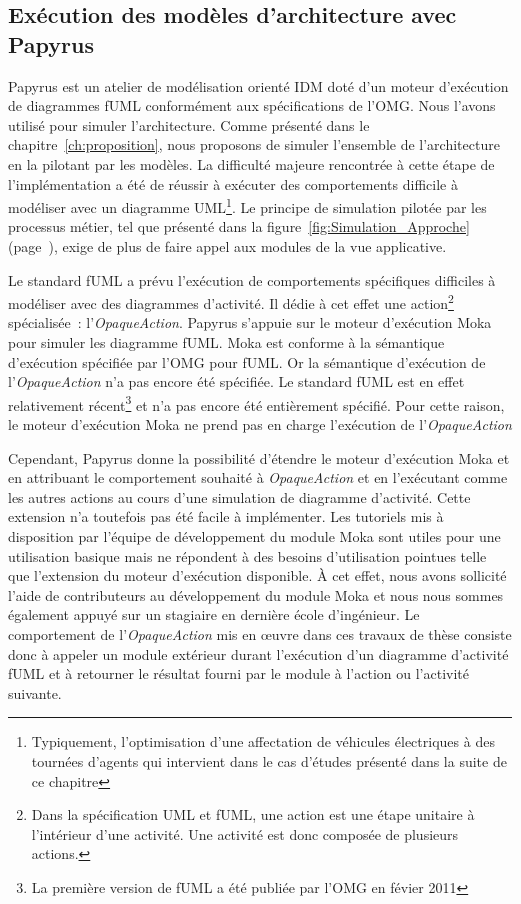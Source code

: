     \subsection{Exécution des modèles d’architecture avec Papyrus}
    \label{sec:opaque_action_papyrus}

    Papyrus est un atelier de modélisation orienté IDM doté d'un moteur
    d'exécution de diagrammes fUML conformément aux spécifications de l'OMG.
    Nous l'avons utilisé pour simuler l'architecture. Comme présenté dans le
    chapitre~\ref{ch:proposition}, nous proposons de simuler l'ensemble de
    l'architecture en la pilotant par les modèles.  La difficulté majeure
    rencontrée à cette étape de l'implémentation a été de réussir à exécuter des
    comportements difficile à modéliser avec un diagramme
    UML\footnote{Typiquement, l'optimisation d'une affectation de véhicules
    électriques à des tournées d'agents qui intervient dans le cas d'études
    présenté dans la suite de ce chapitre}. Le principe de simulation pilotée
    par les processus métier, tel que présenté dans la
    figure~\ref{fig:Simulation_Approche}
    (page~\pageref{fig:Simulation_Approche}), exige de plus de faire appel aux
    modules de la vue applicative.
    
    Le standard fUML a prévu l'exécution de comportements spécifiques difficiles
    à modéliser avec  des diagrammes d'activité. Il dédie à cet effet une
    action\footnote{Dans la spécification UML et fUML, une action est une étape
    unitaire à l'intérieur d'une activité. Une activité est donc composée de
    plusieurs actions.} spécialisée~: l'\emph{OpaqueAction}. Papyrus s'appuie
    sur le moteur d'exécution Moka pour simuler les diagramme fUML. Moka est
    conforme à la sémantique d'exécution spécifiée par l'OMG pour fUML. Or la
    sémantique d'exécution de l'\emph{OpaqueAction} n'a pas encore été
    spécifiée. Le standard fUML est en effet relativement récent\footnote{La
    première version de fUML a été publiée par l'OMG en févier 2011} et n'a pas
    encore été entièrement spécifié. Pour cette raison, le moteur d'exécution
    Moka ne prend pas en charge l'exécution de l'\emph{OpaqueAction}

    Cependant, Papyrus donne la possibilité d'étendre le moteur d'exécution Moka
    et en attribuant le comportement souhaité à \emph{OpaqueAction} et en
    l'exécutant comme les autres actions au cours d'une simulation de diagramme
    d'activité. Cette extension n'a toutefois pas été facile à implémenter. Les
    tutoriels mis à disposition par l'équipe de développement du module Moka
    sont utiles pour une utilisation basique mais ne répondent à des besoins
    d'utilisation pointues telle que l'extension du moteur d'exécution
    disponible. À cet effet, nous avons sollicité l'aide de contributeurs au
    développement du module Moka et nous nous sommes également appuyé sur un
    stagiaire en dernière école d'ingénieur. Le comportement de
    l'\emph{OpaqueAction} mis en œuvre dans ces travaux de thèse consiste donc à
    appeler un module extérieur durant l'exécution d'un diagramme d'activité
    fUML et à retourner le résultat fourni par le module à l'action ou
    l'activité suivante.

